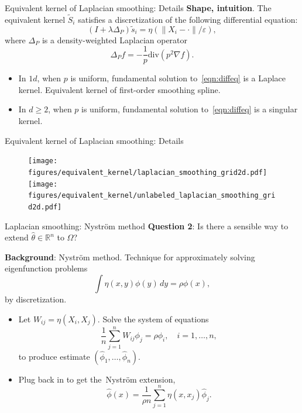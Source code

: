 \documentclass[xcolor=dvipsnames]{beamer}
\newcommand{\Reals}{\mathbb{R}}
\newcommand{\wh}[1]{\widehat{#1}}
\newcommand{\wt}[1]{\widetilde{#1}}
\begin{document}
\begin{frame}[t]{Equivalent kernel of Laplacian smoothing: Details}
\textbf{Shape, intuition}. The equivalent kernel $\wt{S}_i$ satisfies a discretization of the following differential equation:
\begin{equation}
\label{eqn:diffeq}
(I + \lambda \Delta_P) \wt{s}_i = \eta(\|X_i - \cdot\|/\varepsilon),
\end{equation}
where $\Delta_P$ is a density-weighted Laplacian operator
\begin{equation*}
\Delta_Pf = -\frac{1}{p} \mathrm{div}(p^2 \nabla f).
\end{equation*}
\pause
\begin{itemize}
	\item In $1d$, when $p$ is uniform, fundamental solution to~\eqref{eqn:diffeq} is a Laplace kernel. Equivalent kernel of first-order smoothing spline.
	\item In $d \geq 2$, when $p$ is uniform, fundamental solution to~\eqref{eqn:diffeq} is a singular kernel. 
\end{itemize}
\end{frame}

\begin{frame}[t]{Equivalent kernel of Laplacian smoothing: Details}
\begin{figure}
	\texttt{[image: figures/equivalent\_kernel/laplacian\_smoothing\_grid2d.pdf]}
	\texttt{[image: figures/equivalent\_kernel/unlabeled\_laplacian\_smoothing\_grid2d.pdf]}
\end{figure}
\end{frame}

\begin{frame}[t]{Laplacian smoothing: Nystr\"{o}m method}
\textbf{Question 2}: Is there a \alert{sensible} way to extend $\wh{\theta} \in \Reals^n$ to $\Omega$?
\pause

\textbf{Background}: Nystr\"{o}m method. Technique for approximately solving eigenfunction problems
\begin{equation*}
\int \eta(x,y) \phi(y) \,dy = \rho \phi(x),
\end{equation*}
by discretization. \pause
\begin{itemize}
	\item Let $W_{ij} = \eta(X_i,X_j)$. Solve the system of equations 
	$$\frac{1}{n}\sum_{j = 1}^{n} W_{ij} \phi_j = \rho \phi_i, \quad i = 1,\ldots,n,$$
	to produce estimate $(\hat{\phi}_1,\ldots,\hat{\phi}_n)$.
	\item Plug back in to get the~\alert{Nystr\"{o}m extension},
	\begin{equation*}
	\wh{\phi}(x) = \frac{1}{\rho n}\sum_{j = 1}^{n} \eta(x,x_j)\wh{\phi}_j.
	\end{equation*}
\end{itemize}
\end{frame}
\end{document}
